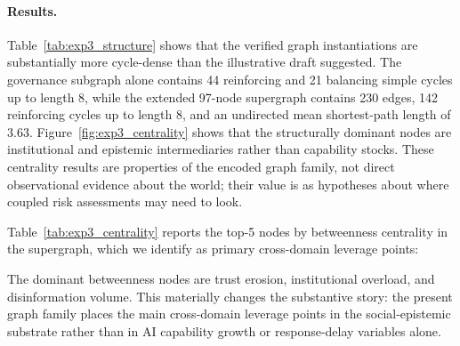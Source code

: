 \documentclass[11pt]{article}
\begin{document}
\paragraph{Results.} Table~\ref{tab:exp3_structure} shows that the verified graph instantiations are substantially more cycle-dense than the illustrative draft suggested. The governance subgraph alone contains 44 reinforcing and 21 balancing simple cycles up to length 8, while the extended 97-node supergraph contains 230 edges, 142 reinforcing cycles up to length 8, and an undirected mean shortest-path length of 3.63. Figure~\ref{fig:exp3_centrality} shows that the structurally dominant nodes are institutional and epistemic intermediaries rather than capability stocks. These centrality results are properties of the encoded graph family, not direct observational evidence about the world; their value is as hypotheses about where coupled risk assessments may need to look.

Table~\ref{tab:exp3_centrality} reports the top-5 nodes by betweenness centrality in the supergraph, which we identify as primary cross-domain leverage points:

\begin{table}[t]
\centering
\caption{Top-5 supergraph nodes by betweenness centrality with Meadows leverage point mapping.}
\label{tab:exp3_centrality}
\small
{}
\end{table}

The dominant betweenness nodes are trust erosion, institutional overload, and disinformation volume. This materially changes the substantive story: the present graph family places the main cross-domain leverage points in the social-epistemic substrate rather than in AI capability growth or response-delay variables alone.
\end{document}
